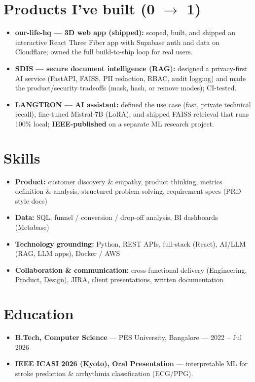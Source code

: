 \documentclass[10pt,a4paper]{article}
\begin{document}
\section*{Products I've built (0 $\rightarrow$ 1)}
\begin{itemize}
\item \textbf{our-life-hq --- 3D web app (shipped):} scoped, built, and shipped an interactive React Three Fiber app with Supabase auth and data on Cloudflare; owned the full build-to-ship loop for real users.
\item \textbf{SDIS --- secure document intelligence (RAG):} designed a privacy-first AI service (FastAPI, FAISS, PII redaction, RBAC, audit logging) and made the product/security tradeoffs (mask, hash, or remove modes); CI-tested.
\item \textbf{LANGTRON --- AI assistant:} defined the use case (fast, private technical recall), fine-tuned Mistral-7B (LoRA), and shipped FAISS retrieval that runs 100\% local; \textbf{IEEE-published} on a separate ML research project.
\end{itemize}
\section*{Skills}
\begin{itemize}
\item \textbf{Product:} customer discovery \& empathy, product thinking, metrics definition \& analysis, structured problem-solving, requirement specs (PRD-style docs)
\item \textbf{Data:} SQL, funnel / conversion / drop-off analysis, BI dashboards (Metabase)
\item \textbf{Technology grounding:} Python, REST APIs, full-stack (React), AI/LLM (RAG, LLM apps), Docker / AWS
\item \textbf{Collaboration \& communication:} cross-functional delivery (Engineering, Product, Design), JIRA, client presentations, written documentation
\end{itemize}
\section*{Education}
\begin{itemize}
\item \textbf{B.Tech, Computer Science} --- PES University, Bangalore --- 2022 -- Jul 2026
\item \textbf{IEEE ICASI 2026 (Kyoto), Oral Presentation} --- interpretable ML for stroke prediction \& arrhythmia classification (ECG/PPG).
\end{itemize}
\end{document}

